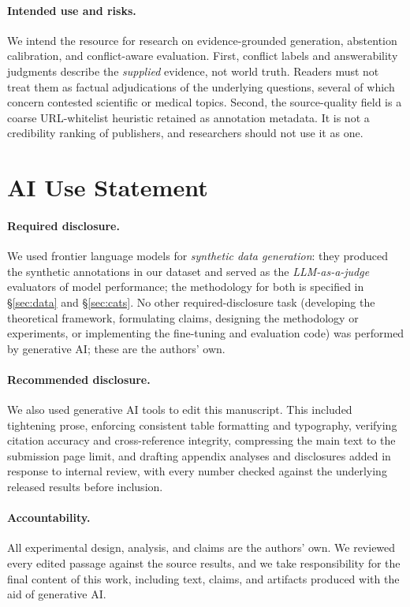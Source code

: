 \paragraph{Intended use and risks.} We intend the resource for research on
evidence-grounded generation, abstention calibration, and conflict-aware
evaluation. First, conflict labels and answerability judgments
describe the \emph{supplied} evidence, not world truth. Readers must not treat
them as factual adjudications of the underlying questions, several of which concern
contested scientific or medical topics. Second, the source-quality field is a
coarse URL-whitelist heuristic retained as annotation metadata. It is not a
credibility ranking of publishers, and researchers should not use it as one.

\section*{AI Use Statement}

\paragraph{Required disclosure.} We used frontier language models for
\textit{synthetic data generation}: they produced the synthetic annotations in
our dataset and served as the \textit{LLM-as-a-judge} evaluators of model
performance; the methodology for both is specified in \S\ref{sec:data} and
\S\ref{sec:cats}. No other required-disclosure task (developing the
theoretical framework, formulating claims, designing the methodology or
experiments, or implementing the fine-tuning and evaluation code) was
performed by generative AI; these are the authors' own.

\paragraph{Recommended disclosure.} We also used generative AI tools to edit
this manuscript. This included tightening prose, enforcing consistent
table formatting and typography, verifying citation accuracy and
cross-reference integrity, compressing the main text to the submission page
limit, and drafting appendix analyses and disclosures added in response to
internal review, with every number checked against the underlying
released results before inclusion.

\paragraph{Accountability.} All experimental design, analysis, and claims are
the authors' own. We reviewed every edited passage against the source
results, and we take responsibility for the final content of this work,
including text, claims, and artifacts produced with the aid of generative AI.
